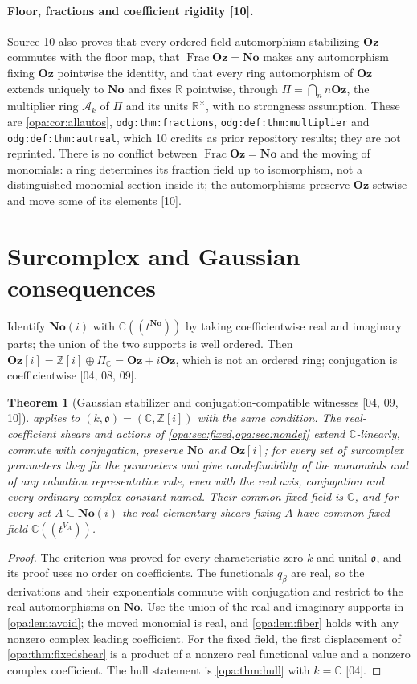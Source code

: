\documentclass[11pt,oneside]{article}
\numberwithin{equation}{section}
\newtheorem{theorem}{Theorem}[section]
\theoremstyle{definition}
\theoremstyle{remark}
\newcommand{\No}{\mathbf{No}}
\newcommand{\Oz}{\mathbf{Oz}}
\newcommand{\Og}{\mathbf{Oz}[i]}
\newcommand{\SC}{\mathbf{No}(i)}
\newcommand{\R}{\mathbb R}
\newcommand{\C}{\mathbb C}
\newcommand{\Z}{\mathbb Z}
\newcommand{\oo}{\mathfrak o}
\newcommand{\Ak}{\mathcal A_k}
\newcommand{\Frac}{\operatorname{Frac}}
\newcommand{\Hahn}[2]{#1((t^{#2}))}
\newcommand{\src}[1]{\textup{\textsf{\small[#1]}}}
\newcommand{\lbl}[1]{\nolinkurl{#1}}
\begin{document}
\paragraph{Floor, fractions and coefficient rigidity \src{10}.} Source 10 also
proves that every ordered-field automorphism stabilizing $\Oz$ commutes with the
floor map, that $\Frac\Oz=\No$ makes any automorphism fixing $\Oz$ pointwise the
identity, and that every ring automorphism of $\Oz$ extends uniquely to $\No$ and
fixes $\R$ pointwise, through $\Pi=\bigcap_nn\Oz$, the multiplier ring $\Ak$ of
$\Pi$ and its units $\R^\times$, with no strongness assumption. These are
\cref{opa:cor:allautos}, \lbl{odg:thm:fractions}, \lbl{odg:def:thm:multiplier}
and \lbl{odg:def:thm:autreal}, which 10 credits as prior repository results;
they are not reprinted. There is no conflict between $\Frac\Oz=\No$ and the
moving of monomials: a ring determines its fraction field up to isomorphism,
not a distinguished monomial section inside it; the automorphisms preserve
$\Oz$ setwise and move some of its elements \src{10}.

\section{Surcomplex and Gaussian consequences}\label{opa:sec:complex}

Identify $\SC$ with $\Hahn\C\No$ by taking coefficientwise real and imaginary
parts; the union of the two supports is well ordered. Then
$\Og=\Z[i]\oplus\Pi_\C=\Oz+i\Oz$, which is not an ordered ring; conjugation is
coefficientwise \src{04, 08, 09}.

\begin{theorem}[Gaussian stabilizer and conjugation-compatible witnesses \src{04, 09, 10}]\label{opa:thm:complex}
 applies to $(k,\oo)=(\C,\Z[i])$ with the same condition.
The real-coefficient shears and actions of \cref{opa:sec:fixed,opa:sec:nondef} extend
$\C$-linearly, commute with conjugation, preserve $\No$ and $\Og$; for every set of
surcomplex parameters they fix the parameters and give nondefinability of the
monomials and of any valuation representative rule, even with the real axis,
conjugation and every ordinary complex constant named. Their common fixed field
is $\C$, and for every set $A\subseteq\SC$ the real elementary shears fixing $A$ have
common fixed field $\Hahn\C{V_A}$.
\end{theorem}
\begin{proof}
The criterion was proved for every characteristic-zero $k$ and unital $\oo$, and its
proof uses no order on coefficients. The functionals $q_\beta$ are real, so the
derivations and their exponentials commute with conjugation and restrict to the
real automorphisms on $\No$. Use the union of the real and imaginary supports in
\cref{opa:lem:avoid}; the moved monomial is real, and \cref{opa:lem:fiber} holds with
any nonzero complex leading coefficient. For the fixed field, the first
displacement of \cref{opa:thm:fixedshear} is a product of a nonzero real functional
value and a nonzero complex coefficient. The hull statement is \cref{opa:thm:hull}
with $k=\C$ \src{04}.
\end{proof}
\end{document}
